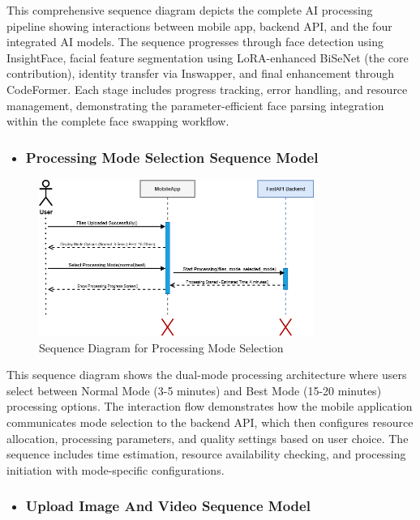 \documentclass[12pt,a4paper]{report}
\begin{document}
This comprehensive sequence diagram depicts the complete AI processing pipeline showing interactions between mobile app, backend API, and the four integrated AI models. The sequence progresses through face detection using InsightFace, facial feature segmentation using LoRA-enhanced BiSeNet (the core contribution), identity transfer via Inswapper, and final enhancement through CodeFormer. Each stage includes progress tracking, error handling, and resource management, demonstrating the parameter-efficient face parsing integration within the complete face swapping workflow.

\begin{itemize}
    \item \subsubsection{Processing Mode Selection Sequence Model}
\end{itemize}

\begin{figure}[H]
\centering
\includegraphics[width=0.8\textwidth]{figures/processing_mode_selection_sequence.png}
\caption{Sequence Diagram for Processing Mode Selection}
\label{fig:processing_mode_selection_sequence}
\end{figure}

This sequence diagram shows the dual-mode processing architecture where users select between Normal Mode (3-5 minutes) and Best Mode (15-20 minutes) processing options. The interaction flow demonstrates how the mobile application communicates mode selection to the backend API, which then configures resource allocation, processing parameters, and quality settings based on user choice. The sequence includes time estimation, resource availability checking, and processing initiation with mode-specific configurations.

\begin{itemize}
    \item \subsubsection{Upload Image And Video Sequence Model}
\end{itemize}
\end{document}
